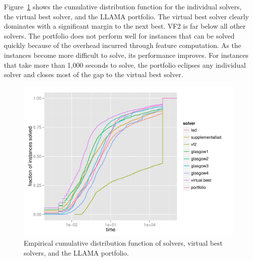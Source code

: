 \documentclass{llncs}
\begin{document}
Figure~\ref{fig:portfolio-ecdf} shows the cumulative distribution function for
the individual solvers, the virtual best solver, and the LLAMA portfolio. The
virtual best solver clearly dominates with a significant margin to the next
best. VF2 is far below all other solvers. The portfolio does not perform well
for instances that can be solved quickly because of the overhead incurred
through feature computation. As the instances become more difficult to solve,
its performance improves. For instances that take more than 1,000 seconds to
solve, the portfolio eclipses any individual solver and closes most of the gap
to the virtual best solver.

\begin{figure}[!ht]
\includegraphics[width=\textwidth]{figures/portfolio-ecdf}
\caption{Empirical cumulative distribution function of solvers, virtual best
solvers, and the LLAMA portfolio.}
\label{fig:portfolio-ecdf}
\end{figure}
\end{document}
